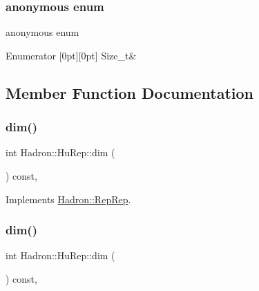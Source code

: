 \subsubsection{\texorpdfstring{anonymous enum}{anonymous enum}}
{\footnotesize\ttfamily anonymous enum}

\begin{DoxyEnumFields}{Enumerator}
[0pt][0pt]{}\mbox{\label{structHadron_1_1HuRep_a43686c1c11b058cccdc4e7f8cdb93cc8a11f941d99fca7e86652c1460d6c185ed}} 
Size\+\_\+t&\\
\hline

\end{DoxyEnumFields}


\subsection{Member Function Documentation}
\mbox{\label{structHadron_1_1HuRep_aa222968e65bfc228eb9acf15a7df0388}} 
\subsubsection{\texorpdfstring{dim()}{dim()}\hspace{0.1cm}{\footnotesize\ttfamily [1/3]}}
{\footnotesize\ttfamily int Hadron\+::\+Hu\+Rep\+::dim (\begin{DoxyParamCaption}{ }\end{DoxyParamCaption}) const\hspace{0.3cm}{\ttfamily [inline]}, {\ttfamily [virtual]}}



Implements \mbox{\hyperlink{structHadron_1_1RepRep_a92c8802e5ed7afd7da43ccfd5b7cd92b}{Hadron\+::\+Rep\+Rep}}.

\mbox{\label{structHadron_1_1HuRep_aa222968e65bfc228eb9acf15a7df0388}} 
\subsubsection{\texorpdfstring{dim()}{dim()}\hspace{0.1cm}{\footnotesize\ttfamily [2/3]}}
{\footnotesize\ttfamily int Hadron\+::\+Hu\+Rep\+::dim (\begin{DoxyParamCaption}{ }\end{DoxyParamCaption}) const\hspace{0.3cm}{\ttfamily [inline]}, {\ttfamily [virtual]}}



